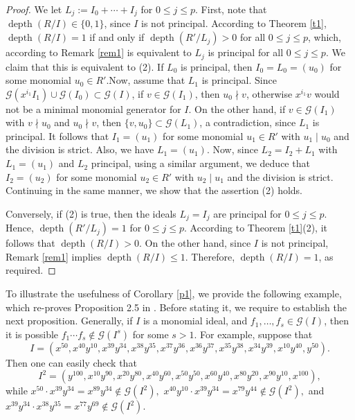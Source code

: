 \documentclass[11pt]{amsart}
\def\depth{\operatorname{depth}}
\begin{document}
\begin{proof}
We let $L_j:=I_0+\cdots+I_j$ for $0\leq j\leq p$. First, note that $\depth(R/I)\in \{0,1\}$, since $I$ is not principal.
According to Theorem \ref{t1}, $\depth(R/I)=1$ if and only if $\depth(R'/L_j)>0$ for all $0\leq j\leq p$, which, according
to Remark \ref{rem1} is equivalent to $L_j$ is principal  for all $0\leq j\leq p$. We claim that this is equivalent to (2).
If $L_0$ is principal, then $I_0=L_0=(u_0)$ for some monomial $u_0\in R'$.Now, assume that $L_1$ is principal.
Since $\mathcal{G}(x^{i_1}I_1)\cup \mathcal{G}(I_0)\subset \mathcal{G}(I)$, if $v\in \mathcal{G}(I_1)$,  then $u_0\nmid v$, otherwise $x^{i_1}v$ would not be a minimal monomial
generator for $I$. On the other hand, if $v\in \mathcal{G}(I_1)$ with $v\nmid u_0$ and $u_0\nmid v$,  then $\{v,u_0\}\subset \mathcal{G}(L_1)$, a contradiction,
since $L_1$ is principal. It follows that $I_1=(u_1)$ for some monomial $u_1\in R'$ with $u_1\mid u_0$ and the division is strict. Also,
we have $L_1=(u_1)$. Now, since $L_2=I_2+L_1$ with $L_1=(u_1)$ and $L_2$ principal, using a similar argument, we deduce that
$I_2=(u_2)$ for some monomial $u_2\in R'$ with $u_2\mid u_1$ and the division is strict. Continuing in the same manner, we show that
the assertion (2) holds. 

Conversely, if (2) is true, then  the ideals $L_j=I_j$ are principal  for $0\leq j\leq p$. Hence, $\depth(R'/L_j)=1$  for $0\leq j\leq p$.
According to Theorem \ref{t1}(2), it follows that $\depth(R/I)>0$. On the other hand, since $I$ is not principal, Remark \ref{rem1} implies $\depth(R/I)\leq 1$. Therefore, $\depth(R/I)=1$, as required.
\end{proof}


To illustrate the usefulness of Corollary \ref{p1}, we provide the following example, which re-proves   Proposition 2.5  in \cite{MST}. 
Before  stating it, we require to establish the next proposition.  Generally, if $I$ is a monomial ideal, and  $f_1,\ldots,f_s \in \mathcal{G}(I)$, 
then  it is possible $f_1\cdots f_s \notin \mathcal{G}(I^s)$ for some $s>1$. For example, suppose that 
\[
I=(x^{50},x^{40}y^{10},x^{39}y^{34},x^{38}y^{35},x^{37}y^{36},
x^{36}y^{37},x^{35}y^{38},x^{34}y^{39},x^{10}y^{40},y^{50}).
\]
Then one can easily check that 
\[
I^2=(y^{100},x^{10}y^{90},x^{20}y^{80},x^{40}y^{60},
x^{50}y^{50},x^{60}y^{40},x^{80}y^{20},x^{90}y^{10},x^{100}), 
\]
while $x^{50}\cdot x^{39}y^{34}= x^{89}y^{34}\notin \mathcal{G}(I^2),$ 
$x^{40}y^{10}\cdot x^{39}y^{34}= x^{79}y^{44}\notin \mathcal{G}(I^2),$ and 
$x^{39}y^{34}\cdot x^{38}y^{35} = x^{77}y^{69}\notin \mathcal{G}(I^2).$ 
\end{document}
